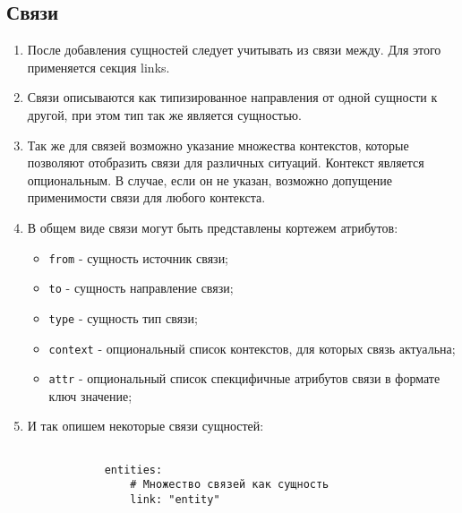 \documentclass[final]{article}
\begin{document}
    \subsection{Связи}
        \begin{enumerate}

            \item После добавления сущностей следует учитывать из связи 
            между. Для этого применяется секция links.

            \item Связи описываются как типизированное направления от одной сущности 
            к другой, при этом тип так же является сущностью. 

            \item Так же для связей возможно указание множества контекстов, 
            которые позволяют отобразить связи для различных ситуаций. Контекст 
            является опциональным. В случае, если он не указан, возможно 
            допущение применимости связи для любого контекста.

            \item В общем виде связи могут быть представлены кортежем атрибутов:
            \begin{itemize}
                \item \texttt{from} - сущность источник связи;
                \item \texttt{to} - сущность направление связи;
                \item \texttt{type} - сущность тип связи;
                \item \texttt{context} - опциональный список контекстов, для которых связь актуальна;
                \item \texttt{attr} - опциональный список спекцифичные атрибутов 
                связи в формате ключ значение;
            \end{itemize}

            \item И так опишем некоторые связи сущностей:

            \begin{verbatim}

            entities:
                # Множество связей как сущность
                link: "entity"


\end{verbatim}
\end{enumerate}
\end{document}
